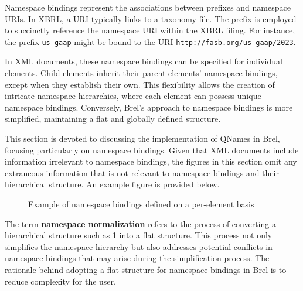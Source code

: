 Namespace bindings represent the associations between prefixes and namespace URIs.
In XBRL, a URI typically links to a taxonomy file.
The prefix is employed to succinctly reference the namespace URI within the XBRL filing.
For instance, the prefix \texttt{us-gaap} might be bound to the URI \texttt{http://fasb.org/us-gaap/2023}.

In XML documents, these namespace bindings can be specified for individual elements.
Child elements inherit their parent elements' namespace bindings, except when they establish their own.
This flexibility allows the creation of intricate namespace hierarchies, where each element can possess unique namespace bindings.
Conversely, Brel's approach to namespace bindings is more simplified, maintaining a flat and globally defined structure.

This section is devoted to discussing the implementation of QNames in Brel, focusing particularly on namespace bindings.
Given that XML documents include information irrelevant to namespace bindings,
the figures in this section omit any extraneous information that is not relevant to namespace bindings and their hierarchical structure.
An example figure is provided below.

\begin{figure}[H]
    \caption{Example of namespace bindings defined on a per-element basis}
    \label{fig:custom_namespace_notation_example}
\end{figure}

The term \textbf{namespace normalization} refers to the process of converting a hierarchical structure such as \ref{fig:custom_namespace_notation_example} into a flat structure.
This process not only simplifies the namespace hierarchy but also addresses potential conflicts in namespace bindings that may arise during the simplification process.
The rationale behind adopting a flat structure for namespace bindings in Brel is to reduce complexity for the user.

